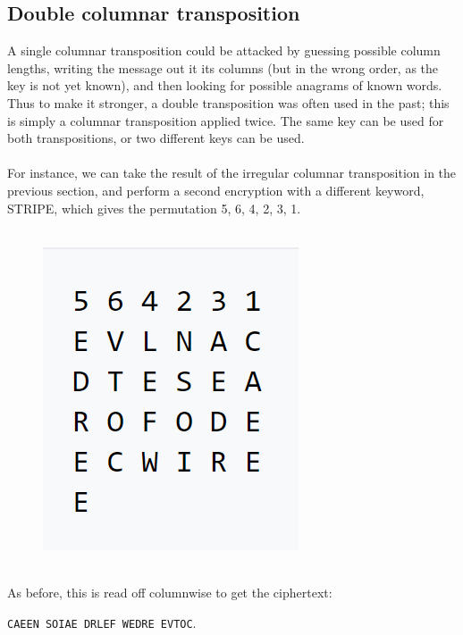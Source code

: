 \documentclass[Lau,binding=0.6cm,oneside]{sapthesis}
\begin{document}
\begin{appendices}
\section{Double columnar transposition}
A single columnar transposition could be attacked by guessing possible column lengths, writing the message out it its columns (but in the wrong order, as the key is not yet known), and then looking for possible anagrams of known words. Thus to make it stronger, a double transposition was often used in the past; this is simply a columnar transposition applied twice. The same key can be used for both transpositions, or two different keys can be used.\\\\
For instance, we can take the result of the irregular columnar transposition in the previous section, and perform a second encryption with a different keyword, \textsf{STRIPE}, which gives the permutation 5, 6, 4, 2, 3, 1.\\\\

\begin{figure}[H]
\includegraphics[scale=0.42]{double_columnar}
\centering
\caption{}
\centering
\end{figure}
\ \\
As before, this is read off columnwise to get the ciphertext: \par\colorbox{gray!12}{\small{\texttt{CAEEN SOIAE DRLEF WEDRE EVTOC}}}.\\\\


\end{appendices}
\end{document}
